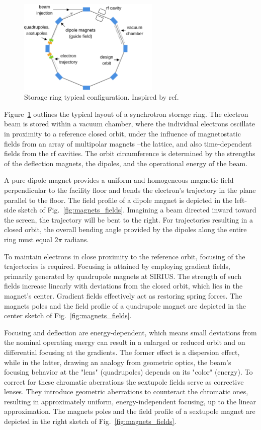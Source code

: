 \begin{figure}[tb]
    \centering
    \includegraphics[width=0.6\textwidth]{Images/storage_ring.png}
    \caption[Storage ring typical configuration.]{Storage ring typical configuration. Inspired by ref.~\cite{sands_physics_1969}}
    \label{fig:storage_ring}
\end{figure}
Figure~\ref{fig:storage_ring} outlines the typical layout of a synchrotron storage ring. The electron beam is stored within a vacuum chamber, where the individual electrons oscillate in proximity to a reference closed orbit, under the influence of magnetostatic fields from an array of multipolar magnets --the lattice, and also time-dependent fields from the \gls*{rf} cavities. The orbit circumference is determined by the strengths of the deflection magnets, the dipoles, and the operational energy of the beam.

A pure dipole magnet provides a uniform and homogeneous magnetic field perpendicular to the facility floor and bends the electron's trajectory in the plane parallel to the floor. The field profile of a dipole magnet is depicted in the left-side sketch of Fig.~\ref{fig:magnets_fields}. Imagining a beam directed inward toward the screen, the trajectory will be bent to the right. For trajectories resulting in a closed orbit, the overall bending angle provided by the dipoles along the entire ring must equal $2\pi$ radians.

To maintain electrons in close proximity to the reference orbit, focusing of the trajectories is required. Focusing is attained by employing gradient fields, primarily generated by quadrupole magnets at SIRIUS. The strength of such fields increase linearly with deviations from the closed orbit, which lies in the magnet's center. Gradient fields effectively act as restoring spring forces. The magnets poles and the field profile of a quadrupole magnet are depicted in the center sketch of Fig.~\ref{fig:magnets_fields}.

Focusing and deflection are energy-dependent, which means small deviations from the nominal operating energy can result in a enlarged or reduced orbit and on differential focusing at the gradients. The former effect is a dispersion effect, while in the latter, drawing an analogy from geometric optics, the beam's focusing behavior at the "lens" (quadrupoles) depends on its "color" (energy). To correct for these chromatic aberrations the sextupole fields serve as corrective lenses. They introduce geometric aberrations to counteract the chromatic ones, resulting in approximately uniform, energy-independent focusing, up to the linear approximation. The magnets poles and the field profile of a sextupole magnet are depicted in the right sketch of Fig.~\ref{fig:magnets_fields}.

